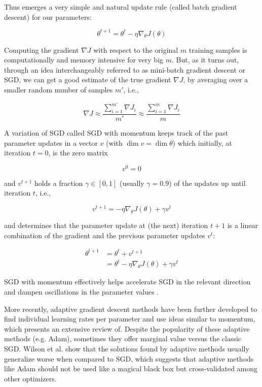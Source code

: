Thus emerges a very simple and natural update rule (called batch gradient descent) for our parameters:

$$
\theta^{t+1} = \theta^t - \eta \nabla_{\theta} J(\theta)
$$

Computing the gradient $\nabla J$ with respect to the original $m$ training samples is computationally and memory intensive for very big $m$. But, as it turns out, through an idea interchangeably referred to as mini-batch gradient descent or \ac{SGD}, we can get a good estimate of the true gradient $\nabla J$, by averaging over a smaller random number of samples $m'$, i.e.,

$$
\nabla J \approx \frac{\sum_{i=1}^{m'} \nabla J_i}{m'} \approx \frac{\sum_{i=1}^m \nabla J_{i}}{m}
$$

A variation of \ac{SGD} called \ac{SGD} with momentum \cite{ruder2016} keeps track of the past parameter updates in a vector $v$ (with $\dim v = \dim \theta$) which initially, at iteration $t = 0$, is the zero matrix

$$
v^0 = 0
$$

and $v^{t+1}$ holds a fraction $\gamma \in [0,1]$ (usually $\gamma = 0.9$) of the updates up until iteration $t$, i.e.,

$$
v^{t+1} = -\eta \nabla_{\theta} J(\theta) + \gamma v^{t}
$$

and determines that the parameter update at (the next) iteration $t+1$ is a linear combination of the gradient and the previous parameter updates $v^{t}$:

\begin{align*}
    \theta^{t+1} &= \theta^{t} + v^{t+1} \\
                 &= \theta^{t} - \eta \nabla_{\theta} J(\theta) + \gamma v^{t}
\end{align*}

\ac{SGD} with momentum effectively helps accelerate \ac{SGD} in the relevant direction and dampen oscillations in the parameter values \cite{ruder2016}.

More recently, adaptive gradient descent methods have been further developed to find individual learning rates per parameter and use ideas similar to momentum, which \citeauthor{ruder2016} \cite{ruder2016} presents an extensive review of. Despite the popularity of these adaptive methods (e.g. Adam), sometimes they offer marginal value versus the classic \ac{SGD}. Wilson et al. \cite{wilson2017} show that the solutions found by adaptive methods usually generalize worse when compared to \ac{SGD}, which suggests that adaptive methods like Adam should not be used like a magical black box but cross-validated among other optimizers.

